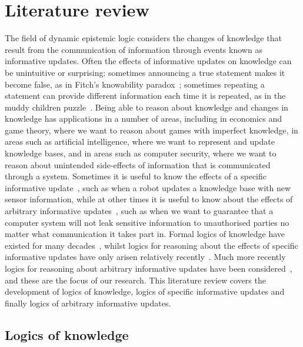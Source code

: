 \chapter{Literature review}\label{literature}

The field of dynamic epistemic logic considers the changes of knowledge that
result from the communication of information through events known as informative
updates. Often the effects of informative updates on knowledge can be
unintuitive or surprising: sometimes announcing a true statement makes it
become false, as in Fitch's knowability paradox~\cite{fitch:1963}; sometimes
repeating a statement can provide different information each time it is
repeated, as in the muddy children puzzle~\cite{barwise:1981, vanditmarsch:2007}.
Being able to reason about knowledge and changes in knowledge has applications
in a number of areas, including in economics and game theory, where we want to
reason about games with imperfect knowledge, in areas such as artificial
intelligence, where we want to represent and update knowledge bases, and in
areas such as computer security, where we want to reason about unintended
side-effects of information that is communicated through a system. Sometimes it
is useful to know the effects of a specific informative
update~\cite{plaza:1989,gerbrandy:1997,baltag:1998}, such as when a robot updates a
knowledge base with new sensor information, while at other times it is useful to
know about the effects of arbitrary informative
updates~\cite{balbiani:2007,agotnes:2010,vanditmarsch:2009}, such as when we want
to guarantee that a computer system will not leak sensitive information to
unauthorised parties no matter what communication it takes part in. Formal
logics of knowledge have existed for many
decades~\cite{vonwright:1951,hintikka:1957,hintikka:1961,hintikka:1962},
whilst logics for reasoning about the effects of specific informative updates
have only arisen relatively recently~\cite{plaza:1989,gerbrandy:1997,baltag:1998}.
Much more recently logics for reasoning about arbitrary informative updates have
been considered~\cite{balbiani:2007,vanditmarsch:2009,agotnes:2010}, and these are
the focus of our research. This literature review covers the development of
logics of knowledge, logics of specific informative updates and finally logics
of arbitrary informative updates.

\section{Logics of knowledge}

